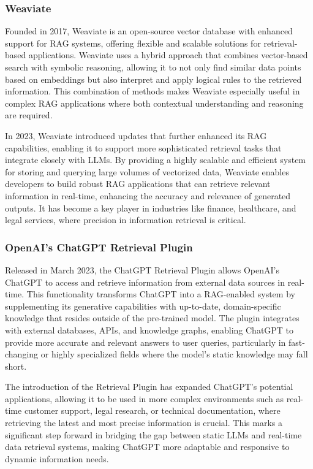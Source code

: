 \subsubsection{Weaviate}

Founded in 2017, Weaviate is an open-source vector database with enhanced support for RAG systems, offering flexible and scalable solutions for retrieval-based applications. 
Weaviate uses a hybrid approach that combines vector-based search with symbolic reasoning, allowing it to not only find similar data points based on embeddings but also interpret and apply logical rules to the retrieved information. 
This combination of methods makes Weaviate especially useful in complex RAG applications where both contextual understanding and reasoning are required.

In 2023, Weaviate introduced updates that further enhanced its RAG capabilities, enabling it to support more sophisticated retrieval tasks that integrate closely with LLMs. 
By providing a highly scalable and efficient system for storing and querying large volumes of vectorized data, Weaviate enables developers to build robust RAG applications that can retrieve relevant information in real-time, enhancing the accuracy and relevance of generated outputs. 
It has become a key player in industries like finance, healthcare, and legal services, where precision in information retrieval is critical.

\subsubsection{OpenAI's ChatGPT Retrieval Plugin}

Released in March 2023, the ChatGPT Retrieval Plugin allows OpenAI’s ChatGPT to access and retrieve information from external data sources in real-time. 
This functionality transforms ChatGPT into a RAG-enabled system by supplementing its generative capabilities with up-to-date, domain-specific knowledge that resides outside of the pre-trained model. 
The plugin integrates with external databases, APIs, and knowledge graphs, enabling ChatGPT to provide more accurate and relevant answers to user queries, particularly in fast-changing or highly specialized fields where the model’s static knowledge may fall short.

The introduction of the Retrieval Plugin has expanded ChatGPT’s potential applications, allowing it to be used in more complex environments such as real-time customer support, legal research, or technical documentation, where retrieving the latest and most precise information is crucial. 
This marks a significant step forward in bridging the gap between static LLMs and real-time data retrieval systems, making ChatGPT more adaptable and responsive to dynamic information needs.

